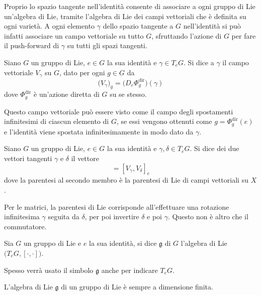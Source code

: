 Proprio lo spazio tangente nell'identità consente di associare a ogni gruppo di Lie un'algebra di Lie, tramite l'algebra di Lie dei campi vettoriali che è definita su ogni varietà. A ogni elemento $\gamma$ dello spazio tangente a $G$ nell'identità si può infatti associare un campo vettoriale su tutto $G$, sfruttando l'azione di $G$ per fare il push-forward di $\gamma$ su tutti gli spazi tangenti.
\begin{definition}
  Siano $G$ un gruppo di Lie, $e \in G$ la sua identità e $\gamma \in T_e G$. Si dice  a $\gamma$ il campo vettoriale $V_\gamma$ su $G$, dato per ogni $g \in G$ da \begin{equation*}
  \big(V_\gamma\big)_g = \big(D_e \Phi^{\text{dir}}_g\big) (\gamma)
  \end{equation*} 
  dove $\Phi^{\text{dir}}_g$ è un'azione diretta di $G$ su se stesso.
\end{definition}
\begin{remark}
  Questo campo vettoriale può essere visto come il campo degli spostamenti infinitesimi di ciascun elemento di $G$, se essi vengono ottenuti come $g=\Phi^{\text{dir}}_g(e)$ e l'identità viene spostata infinitesimamente in modo dato da $\gamma$.
\end{remark}
\begin{definition}
  Siano $G$ un gruppo di Lie, $e \in G$ la sua identità e $\gamma, \delta \in T_e G$. Si dice  dei due vettori tangenti $\gamma$ e $\delta$ il vettore \begin{equation*}
  [\gamma,\delta] = [V_{\gamma}, V_{\delta}]_e
  \end{equation*} 
  dove la parentesi al secondo membro è la parentesi di Lie di campi vettoriali su $X$.
\end{definition}
\begin{remark} \label{rem:matrixComm}
  Per le matrici, la parentesi di Lie corrisponde all'effettuare una rotazione infinitesima $\gamma$ seguita da $\delta$, per poi invertire $\delta$ e poi $\gamma$. Questo non è altro che il commutatore.
\end{remark}
\begin{definition}
  Sia $G$ un gruppo di Lie e $e$ la sua identità, si dice  $\mathfrak{g}$ di $G$ l'algebra di Lie $\big(T_e G, [\cdot ,\cdot ]\big)$.
\end{definition}
\begin{remark}
  Spesso verrà usato il simbolo $\mathfrak{g}$ anche per indicare $T_e G$.
\end{remark}
\begin{theorem}
  L'algebra di Lie $\mathfrak{g}$ di un gruppo di Lie è sempre a dimensione finita.
\end{theorem}


